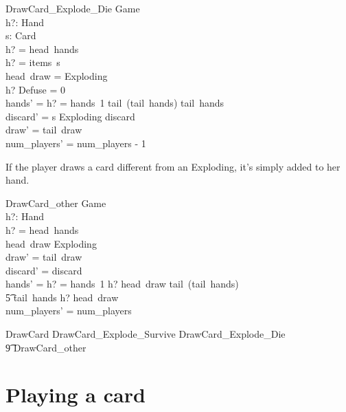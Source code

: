 \documentclass[11pt, fuzz]{article}
\begin{document}
\begin{schema}{DrawCard\_Explode\_Die}
    \Delta Game \\
    h?: Hand \\
    s: \seq Card \\
\where
    h? = head~hands \\
    h? = items~s \\
    head~draw = Exploding \\
    h? \bcount Defuse = 0 \\
    hands' = \IF h? = hands~1 \THEN tail~(tail~hands) \ELSE tail~hands \\
    discard' = s \cat \langle Exploding \rangle \cat discard \\
    draw' = tail~draw \\
    num\_players' = num\_players - 1
\end{schema}

If the player draws a card different from an Exploding, it's simply added to her hand. 

\begin{schema}{DrawCard\_other}
    \Delta Game \\
    h?: Hand \\
\where
    h? = head~hands \\
    head~draw \neq Exploding \\
    draw' = tail~draw \\
    discard' = discard \\
    hands' = \IF h? = hands~1 \THEN \langle h? \uplus \lbag head~draw \rbag \rangle \cat tail~(tail~hands)\\ \t5 \ELSE tail~hands \cat \langle h? \uplus \lbag head~draw \rbag \rangle \\
    num\_players' = num\_players
\end{schema}

\begin{zed}
    DrawCard  DrawCard\_Explode\_Survive \lor DrawCard\_Explode\_Die\\ \t9 \lor DrawCard\_other 
\end{zed}


\section{Playing a card}
\end{document}
